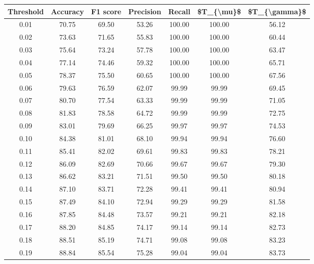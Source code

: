 \begin{tabular}{|c|c|c|c|c|c|c|}
\hline
 Threshold &  Accuracy &  F1 score &  Precision &  Recall &  \$T\_\{\textbackslash mu\}\$ &  \$T\_\{\textbackslash gamma\}\$ \\
\hline
      0.01 &     70.75 &     69.50 &      53.26 &  100.00 &     100.00 &         56.12 \\
      0.02 &     73.63 &     71.65 &      55.83 &  100.00 &     100.00 &         60.44 \\
      0.03 &     75.64 &     73.24 &      57.78 &  100.00 &     100.00 &         63.47 \\
      0.04 &     77.14 &     74.46 &      59.32 &  100.00 &     100.00 &         65.71 \\
      0.05 &     78.37 &     75.50 &      60.65 &  100.00 &     100.00 &         67.56 \\
      0.06 &     79.63 &     76.59 &      62.07 &   99.99 &      99.99 &         69.45 \\
      0.07 &     80.70 &     77.54 &      63.33 &   99.99 &      99.99 &         71.05 \\
      0.08 &     81.83 &     78.58 &      64.72 &   99.99 &      99.99 &         72.75 \\
      0.09 &     83.01 &     79.69 &      66.25 &   99.97 &      99.97 &         74.53 \\
      0.10 &     84.38 &     81.01 &      68.10 &   99.94 &      99.94 &         76.60 \\
      0.11 &     85.41 &     82.02 &      69.61 &   99.83 &      99.83 &         78.21 \\
      0.12 &     86.09 &     82.69 &      70.66 &   99.67 &      99.67 &         79.30 \\
      0.13 &     86.62 &     83.21 &      71.51 &   99.50 &      99.50 &         80.18 \\
      0.14 &     87.10 &     83.71 &      72.28 &   99.41 &      99.41 &         80.94 \\
      0.15 &     87.49 &     84.10 &      72.94 &   99.29 &      99.29 &         81.58 \\
      0.16 &     87.85 &     84.48 &      73.57 &   99.21 &      99.21 &         82.18 \\
      0.17 &     88.20 &     84.85 &      74.17 &   99.14 &      99.14 &         82.73 \\
      0.18 &     88.51 &     85.19 &      74.71 &   99.08 &      99.08 &         83.23 \\
      0.19 &     88.84 &     85.54 &      75.28 &   99.04 &      99.04 &         83.73 \\

\end{tabular}
